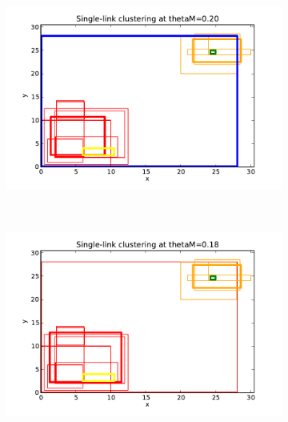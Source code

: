 \begin{figure}[hbt]
    \begin{subfigure}[b]{0.32\textwidth}
            \centering
            \includegraphics[width=\textwidth]{visSL020}
            \caption{}
            \label{fig:slvqs_qs1}
    \end{subfigure}
    ~ %
    \begin{subfigure}[b]{0.32\textwidth}
            \centering
            \includegraphics[width=\textwidth]{visSL018}
            \caption{}
            \label{fig:slvqs_qs2}
    \end{subfigure}
    ~ %
    \begin{subfigure}[b]{0.32\textwidth}

\end{subfigure}
\end{figure}
